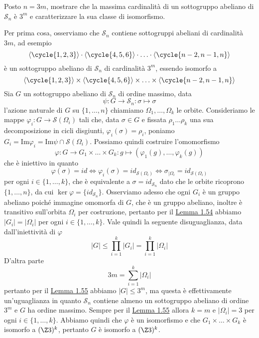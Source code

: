 \documentclass[11pt]{scrartcl}
\begin{document}
	\begin{exercise}
		Posto $n = 3m$, mostrare che la massima cardinalità di un sottogruppo
		abeliano di $\mathcal{S}_n$ è $3^m$ e caratterizzare la sua classe di isomorfismo.
	\end{exercise}
	
	\begin{soln}
		Per prima cosa, osserviamo che $\mathcal{S}_n$ contiene sottogruppi abeliani di
		cardinalità $3m$, ad esempio
		\[
		\langle\cycle{1, 2, 3}\rangle\cdot \langle\cycle{4, 5, 6}\rangle
		\cdot \ldots \cdot \langle\cycle{n - 2, n - 1, n}\rangle
		\]
		è un sottogruppo abeliano di $\mathcal{S}_n$ di cardinalità $3^m$, essendo 
		isomorfo a
		\[
		\langle\cycle{1, 2, 3}\rangle\times\langle\cycle{4, 5, 6}\rangle
		\times\ldots\times\langle\cycle{n - 2, n - 1, n}\rangle
		\]
		Sia $G$ un sottogruppo abeliano di $\mathcal{S}_n$ di ordine massimo, data
		\[
		\psi: G\longrightarrow \mathcal{S}_n : \sigma \longmapsto \sigma
		\]
		l'azione naturale di $G$ su $\{1, \ldots, n\}$ chiamiamo $\Omega_1, \ldots, \Omega_k$
		le orbite. Consideriamo le mappe $\varphi_i : G \longrightarrow \mathcal{S}(\Omega_i)$
		tali che, data $\sigma \in G$ e fissata $\rho_1\ldots\rho_k$ una sua decomposizione
		in cicli disgiunti, $\varphi_i(\sigma) = \rho_i$, poniamo $G_i = \mathrm{Im}\varphi_i=
		\mathrm{Im}\psi \cap \mathcal{S}(\Omega_i)$. Possiamo quindi costruire l'omomorfismo
		\[
		\varphi: G \longrightarrow G_1\times \ldots \times G_k : g \longmapsto (\varphi_1(g), \ldots, \varphi_k(g))
		\]
		che è iniettivo in quanto 
		\[
		\varphi(\sigma) = id \iff \varphi_i(\sigma) = id_{\mathcal{S}(\Omega_i)} \iff 
		\sigma_{\mid \Omega_i} = id_{\mathcal{S}(\Omega_i)}
		\]
		per ogni $i \in \{1, \ldots, k\}$, che è equivalente a $\sigma = id_{\mathcal{S}_n}$
		dato che le orbite ricoprono $\{1, \ldots, n\}$, da cui $\ker\varphi = 
		\{id_{\mathcal{S}_n}\}$. Osserviamo adesso che ogni $G_i$ è un gruppo abeliano poiché
		immagine omomorfa di $G$, che è un gruppo abeliano, inoltre è transitivo
		sull'orbita $\Omega_i$ per costruzione, pertanto per il 
		\hyperref[lemma1.54]{Lemma 1.54} abbiamo $|G_i| = |\Omega_i|$ per ogni 
		$i \in \{1, \ldots, k\}$. Vale quindi la seguente disuguaglianza, data
		dall'iniettività di $\varphi$
		\[
		|G| \leqslant \prod_{i = 1}^k|G_i| = \prod_{i = 1}^k |\Omega_i|
		\]
		D'altra parte
		\[
		3m = \sum_{i = 1}^k|\Omega_i|
		\]pertanto per il \hyperref[lemma1.55]{Lemma 1.55} abbiamo $|G| \leq 3^m$, 
		ma questa è effettivamente un'uguaglianza in quanto $\mathcal{S}_n$ contiene
		almeno un sottogruppo abeliano di ordine $3^m$ e $G$ ha ordine massimo.
		Sempre per il \hyperref[lemma1.55]{Lemma 1.55} allora $k = m$ e $|\Omega_i| = 3$
		per ogni $i \in \{1, \ldots, k\}$. Abbiamo quindi che $\varphi$ è un isomorfismo
		e che $G_1\times\ldots\times G_k$ è isomorfo a $(\Z3)^k$, pertanto
		$G$ è isomorfo a $(\Z3)^k$.
	\end{soln}
	
\end{document}
